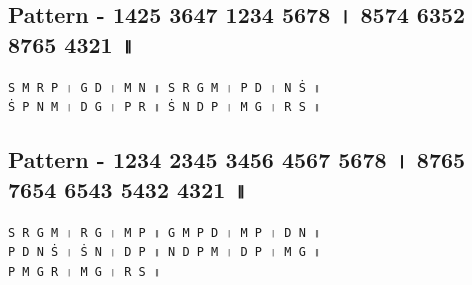 \documentclass[12pt]{article}
\newcommand{\df}[1]{{\devanagarifont#1}}
\begin{document}
\subsection{Pattern - 1425 3647 1234 5678 \df{।} 8574 6352 8765 4321 \df{॥}}
\texttt{S~M~R~P~\df{।}~G~D~\df{।}~M~N~\df{॥}~S~R~G~M~\df{।}~P~D~\df{।}~N~Ṡ~\df{॥}}\\
\texttt{Ṡ~P~N~M~\df{।}~D~G~\df{।}~P~R~\df{॥}~Ṡ~N~D~P~\df{।}~M~G~\df{।}~R~S~\df{॥}}\\
\subsection{Pattern - 1234 2345 3456 4567 5678 \df{।} 8765 7654 6543 5432 4321 \df{॥}}
\texttt{S~R~G~M~\df{।}~R~G~\df{।}~M~P~\df{॥}~G~M~P~D~\df{।}~M~P~\df{।}~D~N~\df{॥}}\\
\texttt{P~D~N~Ṡ~\df{।}~Ṡ~N~\df{।}~D~P~\df{॥}~N~D~P~M~\df{।}~D~P~\df{।}~M~G~\df{॥}}\\
\texttt{P~M~G~R~\df{।}~M~G~\df{।}~R~S~\df{॥}}\\
\end{document}
